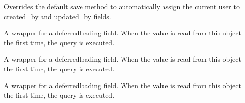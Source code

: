 \documentclass[letterpaper,10pt,english]{sphinxmanual}
\begin{document}
\begin{fulllineitems}

\begin{fulllineitems}
\label{\detokenize{payments:payments.models.Payment.save}}
\pysigstartsignatures
\pysiglinewithargsret
{}
{\sphinxparamcomma {}}
{}
\pysigstopsignatures
\sphinxAtStartPar
Overrides the default save method to automatically assign
the current user to created\_by and updated\_by fields.

\end{fulllineitems}


\begin{fulllineitems}
\label{\detokenize{payments:id3}}
\pysigstartsignatures
\pysigline
{}
\pysigstopsignatures
\sphinxAtStartPar
A wrapper for a deferred\sphinxhyphen{}loading field. When the value is read from this
object the first time, the query is executed.

\end{fulllineitems}


\begin{fulllineitems}
\label{\detokenize{payments:id4}}
\pysigstartsignatures
\pysigline
{}
\pysigstopsignatures
\sphinxAtStartPar
A wrapper for a deferred\sphinxhyphen{}loading field. When the value is read from this
object the first time, the query is executed.

\end{fulllineitems}


\begin{fulllineitems}
\label{\detokenize{payments:id5}}
\pysigstartsignatures
\pysigline
{}
\pysigstopsignatures
\sphinxAtStartPar
A wrapper for a deferred\sphinxhyphen{}loading field. When the value is read from this
object the first time, the query is executed.


\end{fulllineitems}
\end{fulllineitems}
\end{document}

